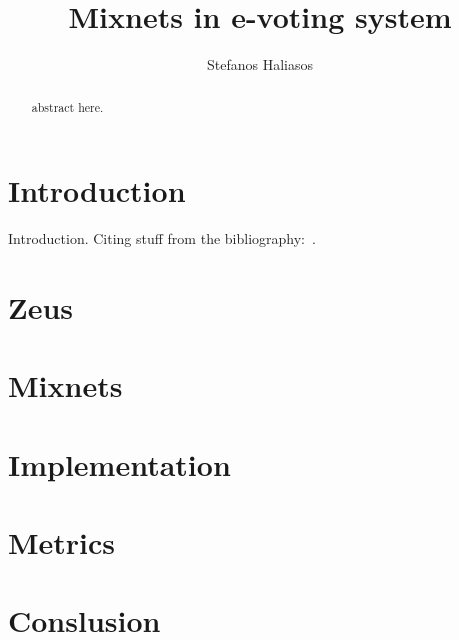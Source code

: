 \documentclass{article}
\date{}
\begin{document}
\title{Mixnets in e-voting system}

\author{Stefanos Haliasos}

\maketitle
\begin{abstract}
    abstract here.
\end{abstract}

\section{Introduction}

Introduction.
Citing stuff from the
bibliography:~\cite{FLSZ17}.

\section{Zeus}

\section{Mixnets}

\section{Implementation}

\section{Metrics}

\section{Conslusion}



\end{document}
